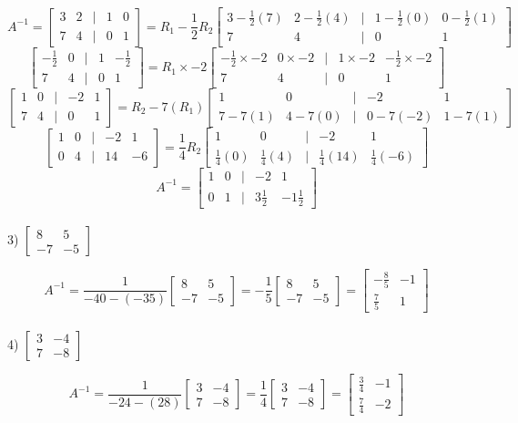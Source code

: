 \documentclass[a4paper]{article}
\begin{document}
\[A^{-1} =
\begin{bmatrix}
3&2&|&1&0\\
7&4&|&0&1
\end{bmatrix} = R_1-\frac{1}{2}R_2
\begin{bmatrix}
3-\frac{1}{2}(7)&2-\frac{1}{2}(4)&|&1-\frac{1}{2}(0)&0-\frac{1}{2}(1)\\
7&4&|&0&1
\end{bmatrix}
\]
\[
\begin{bmatrix}
-\frac{1}{2}&0&|&1&-\frac{1}{2}\\
7&4&|&0&1
\end{bmatrix} = R_1\times-2
\begin{bmatrix}
-\frac{1}{2}\times-2&0\times-2&|&1\times-2&-\frac{1}{2}\times-2\\
7&4&|&0&1
\end{bmatrix}
\]
\[
\begin{bmatrix}
1&0&|&-2&1\\
7&4&|&0&1
\end{bmatrix} = R_2-7(R_1)
\begin{bmatrix}
1&0&|&-2&1\\
7-7(1)&4-7(0)&|&0-7(-2)&1-7(1)
\end{bmatrix}
\]
\[
\begin{bmatrix}
1&0&|&-2&1\\
0&4&|&14&-6
\end{bmatrix}= \frac{1}{4}R_2
\begin{bmatrix}
1&0&|&-2&1\\
\frac{1}{4}(0)&\frac{1}{4}(4)&|&\frac{1}{4}(14)&\frac{1}{4}(-6)
\end{bmatrix}
\]
\[A^{-1} =
\begin{bmatrix}
1&0&|&-2&1\\
0&1&|&3\frac{1}{2}&-1\frac{1}{2}
\end{bmatrix}
\]\\

3) $\begin{bmatrix}
8&5\\
-7&-5
\end{bmatrix}
$

\[A^{-1} =
\frac{1}{-40-(-35)}
\begin{bmatrix}
8&5\\
-7&-5
\end{bmatrix} =
-\frac{1}{5}
\begin{bmatrix}
8&5\\
-7&-5
\end{bmatrix} =
\begin{bmatrix}
-\frac{8}{5}&-1\\
\frac{7}{5}&1
\end{bmatrix}
\]\\

4) $\begin{bmatrix}
3&-4\\
7&-8
\end{bmatrix}$

\[A^{-1} =
\frac{1}{-24-(28)}
\begin{bmatrix}
3&-4\\
7&-8
\end{bmatrix} =
\frac{1}{4}
\begin{bmatrix}
3&-4\\
7&-8
\end{bmatrix} =
\begin{bmatrix}
\frac{3}{4}&-1\\
\frac{7}{4}&-2
\end{bmatrix}
\]
\end{document}
